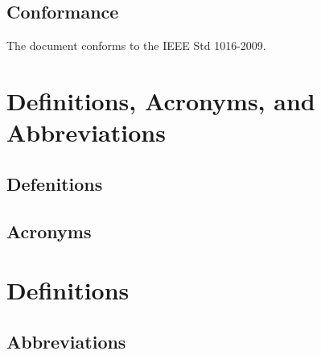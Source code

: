 \documentclass[letterpaper,10pt,titlepage,draftclsnofoot,onecolumn,onesided] {IEEEtran}
\begin{document}
\subsection{Conformance}
The document conforms to the IEEE Std 1016-2009.

\section{Definitions, Acronyms, and Abbreviations}

\subsection{Defenitions}
\newtheorem{Model-View-Controller (MVC)}{Is a design pattern assigns objects in an application one of three roles: model, view, or controller. The pattern defines not only the roles objects play in the application, it defines the way objects communicate with each other. Each of the three types of objects is separated from the others by abstract boundaries and communicates with objects of the other types across those boundaries. The collection of objects of a certain MVC type in an application is sometimes referred to as a layer—for example, model layer.\cite{appleMVC}}
\newtheorem{Integrated Development Environment}{a software application that provides comprehensive facilities to computer programmers for software development}
\newtheorem{dictionary}{An abstract data type composed of a collection of (key, value) pairs, such that each possible key appears at most once in the collection.}

\subsection{Acronyms}
\section{Definitions}
\newtheorem{VSC}{An acronym of Visual Studio Code. Visual Studio Code is the IDE for which the postal extension is being built.}
\newtheorem{IDE}{An acronym of Integrated Development Environment.}
\newtheorem{UI}{An acronym of User Interface}
\newtheorem{MVC}{Model-View-Controller}

\subsection{Abbreviations}


\end{document}
